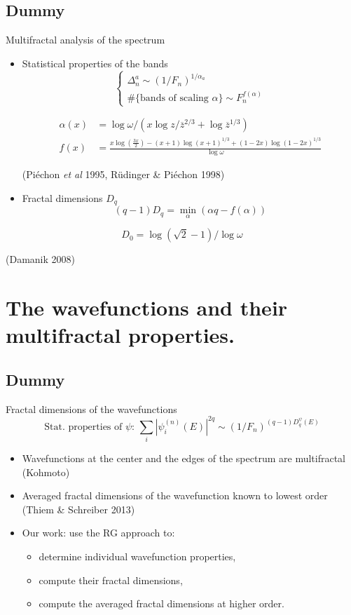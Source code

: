 \documentclass[xcolor=x11names,compress,professionalfonts]{beamer}
\renewcommand{\(}{\begin{columns}}
\renewcommand{\)}{\end{columns}}
\newcommand{\<}[1]{\begin{column}{#1}}
\renewcommand{\>}{\end{column}}
\newcommand{\zb}{\ensuremath{\overline{z}}}
\begin{document}
\subsection{Dummy}
\begin{frame}{Multifractal analysis of the spectrum}

	\begin{itemize}
		\item 	Statistical properties of the bands
		\[
	\begin{cases}
	\Delta_n^a \sim (1/F_n)^{1/\alpha_a} \\
	\#\{\text{bands of scaling~} \alpha \} \sim F_n^{f(\alpha)} 
	\end{cases}
	\]
	
		\begin{align*}
		\alpha(x) &= \log \omega/\left( x \log z/\zb^{2/3} + \log \zb^{1/3} \right) \\
		f(x) &= \frac{x \log \left(\frac{3 x}{2}\right)- (x+1) \log (x+1)^{1/3}+ (1-2 x) \log (1-2 x)^{1/3}}{\log \omega}
	\end{align*}
	\begin{flushright}
	(Piéchon \emph{et al} 1995, Rüdinger \& Piéchon 1998)
	\end{flushright}
		\item Fractal dimensions $D_q$
			\[
				(q-1)D_q = \min_\alpha(\alpha q - f(\alpha))
			\]
	\end{itemize}
	\[ D_0 = \log(\sqrt{2}-1) / \log \omega \]
	\begin{flushright}
	(Damanik 2008)
	\end{flushright}
\end{frame}

\section{The wavefunctions and their multifractal properties.}
\subsection{Dummy}
\begin{frame}{Fractal dimensions of the wavefunctions}
	\[
	\text{Stat. properties of $\psi$:~} 
	\sum_i |\psi_i^{(n)}(E)|^{2q} \sim (1/F_n)^{(q-1)D_q^\psi(E)} 
	\]
\begin{itemize}
	\item Wavefunctions at the center and the edges of the spectrum are multifractal (Kohmoto)
	\item Averaged fractal dimensions of the wavefunction known to lowest order  (Thiem \& Schreiber 2013)
	\item Our work: use the RG approach to:
	\begin{itemize}
		\item  determine individual wavefunction properties,
		\item compute their fractal dimensions,
		\item compute the averaged fractal dimensions at higher order.
	\end{itemize}
\end{itemize}
\end{frame}
\end{document}
